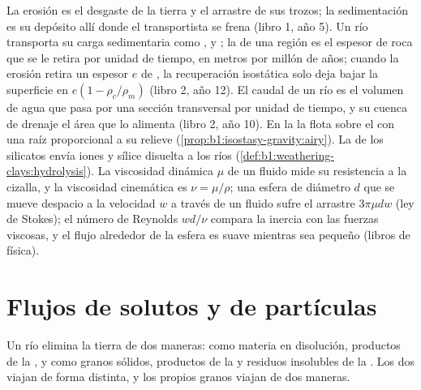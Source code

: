 \begin{recall}
La erosión es el desgaste de la tierra y el arrastre de sus trozos; la sedimentación es su depósito allí donde el transportista se frena (libro 1,
año 5). Un río transporta su carga sedimentaria como ,  y ; la  de una región es
el espesor de roca que se le retira por unidad de tiempo, en metros por millón de años; cuando la erosión retira un espesor $e$ de , la
recuperación isostática solo deja bajar la superficie en $e(1 - \rho_c/\rho_m)$ (libro 2, año 12). El caudal de un río es el volumen de agua que pasa
por una sección transversal por unidad de tiempo, y su cuenca de drenaje el área que lo alimenta (libro 2, año 10). En la  la
 flota sobre el  con una raíz proporcional a su relieve (\cref{prop:b1:isostasy-gravity:airy}). La  de los silicatos envía iones
y sílice disuelta a los ríos (\cref{def:b1:weathering-clays:hydrolysis}). La viscosidad dinámica $\mu$ de un fluido mide su resistencia a la cizalla,
y la viscosidad cinemática es $\nu = \mu/\rho$; una esfera de diámetro $d$ que se mueve despacio a la velocidad $w$ a través de un fluido sufre el
arrastre $3\pi\mu d w$ (ley de Stokes); el número de Reynolds $w d/\nu$ compara la inercia con las fuerzas viscosas, y el flujo alrededor de la esfera es
suave mientras sea pequeño (libros de física).
\end{recall}

\section{Flujos de solutos y de partículas}\label{sec:b1:erosion-transport:fluxes}

Un río elimina la tierra de dos maneras: como materia en disolución, productos de la , y como granos sólidos, productos de la
 y residuos insolubles de la . Los dos viajan de forma distinta, y los propios granos viajan de dos maneras.

